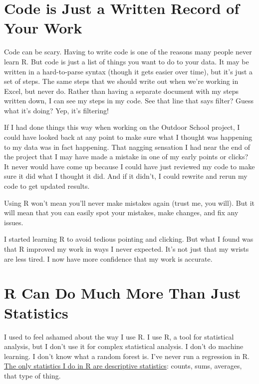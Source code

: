 \documentclass[
]{book}
\begin{document}
\hypertarget{code-is-just-a-written-record-of-your-work}{%
\section*{Code is Just a Written Record of Your Work}\label{code-is-just-a-written-record-of-your-work}}

Code can be scary. Having to write code is one of the reasons many people never learn R. But code is just a list of things you want to do to your data. It may be written in a hard-to-parse syntax (though it gets easier over time), but it's just a set of steps. The same steps that we should write out when we're working in Excel, but never do. Rather than having a separate document with my steps written down, I can see my steps in my code. See that line that says filter? Guess what it's doing? Yep, it's filtering!

If I had done things this way when working on the Outdoor School project, I could have looked back at any point to make sure what I thought was happening to my data was in fact happening. That nagging sensation I had near the end of the project that I may have made a mistake in one of my early points or clicks? It never would have come up because I could have just reviewed my code to make sure it did what I thought it did. And if it didn't, I could rewrite and rerun my code to get updated results.

Using R won't mean you'll never make mistakes again (trust me, you will). But it will mean that you can easily spot your mistakes, make changes, and fix any issues.

I started learning R to avoid tedious pointing and clicking. But what I found was that R improved my work in ways I never expected. It's not just that my wrists are less tired. I now have more confidence that my work is accurate.

\hypertarget{r-can-do-much-more-than-just-statistics}{%
\section*{R Can Do Much More Than Just Statistics}\label{r-can-do-much-more-than-just-statistics}}

I used to feel ashamed about the way I use R. I use R, a tool for statistical analysis, but I don't use it for complex statistical analysis. I don't do machine learning. I don't know what a random forest is. I've never run a regression in R. \href{https://rfortherestofus.com/2018/12/descriptive-stats-r/}{The only statistics I do in R are descriptive statistics}: counts, sums, averages, that type of thing.
\end{document}
